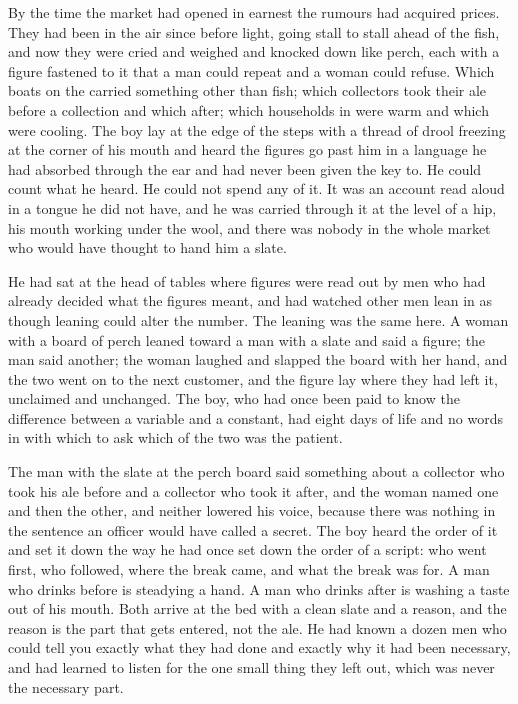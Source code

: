 By the time the market had opened in earnest the rumours had acquired prices. They had been in the air since before light, going stall to stall ahead of the fish, and now they were cried and weighed and knocked down like perch, each with a figure fastened to it that a man could repeat and a woman could refuse. Which boats on the  carried something other than fish; which collectors took their ale before a collection and which after; which households in  were warm and which were cooling. The boy lay at the edge of the steps with a thread of drool freezing at the corner of his mouth and heard the figures go past him in a language he had absorbed through the ear and had never been given the key to. He could count what he heard. He could not spend any of it. It was an account read aloud in a tongue he did not have, and he was carried through it at the level of a hip, his mouth working under the wool, and there was nobody in the whole market who would have thought to hand him a slate.

He had sat at the head of tables where figures were read out by men who had already decided what the figures meant, and had watched other men lean in as though leaning could alter the number. The leaning was the same here. A woman with a board of perch leaned toward a man with a slate and said a figure; the man said another; the woman laughed and slapped the board with her hand, and the two went on to the next customer, and the figure lay where they had left it, unclaimed and unchanged. The boy, who had once been paid to know the difference between a variable and a constant, had eight days of life and no words in  with which to ask which of the two was the patient.

The man with the slate at the perch board said something about a collector who took his ale before and a collector who took it after, and the woman named one and then the other, and neither lowered his voice, because there was nothing in the sentence an officer would have called a secret. The boy heard the order of it and set it down the way he had once set down the order of a script: who went first, who followed, where the break came, and what the break was for. A man who drinks before is steadying a hand. A man who drinks after is washing a taste out of his mouth. Both arrive at the bed with a clean slate and a reason, and the reason is the part that gets entered, not the ale. He had known a dozen men who could tell you exactly what they had done and exactly why it had been necessary, and had learned to listen for the one small thing they left out, which was never the necessary part.

